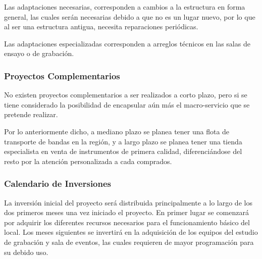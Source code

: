 Las adaptaciones necesarias, corresponden a cambios a la estructura
en forma general, las cuales serán necesarias debido a que no es un lugar
nuevo, por lo que al ser una estructura antigua, necesita reparaciones
periódicas.

Las adaptaciones especializadas corresponden a arreglos técnicos en las
salas de ensayo o de grabación.

\subsubsection{Proyectos Complementarios}

No existen proyectos complementarios a ser realizados a corto plazo,
pero si se tiene considerado la posibilidad de encapsular aún más
el macro-servicio que se pretende realizar.

Por lo anteriormente dicho, a mediano plazo se planea tener una flota
de transporte de bandas en la región, y a largo plazo se planea 
tener una tienda especialista en venta de instrumentos de primera
calidad, diferenciándose del resto por la atención personalizada
a cada comprados.

\subsubsection{Calendario de Inversiones}

La inversión inicial del proyecto será distribuida principalmente a lo largo de
los dos primeros meses una vez iniciado el proyecto. En primer lugar se comenzará
por adquirir los diferentes recursos necesarios para el funcionamiento básico
del local. Los meses siguientes se invertirá en la adquisición de los equipos
del estudio de grabación y sala de eventos, las cuales requieren de mayor
programación para su debido uso.

